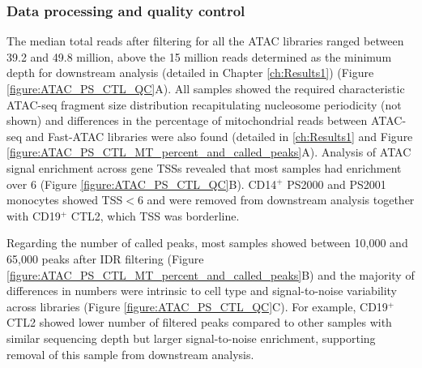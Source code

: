 \subsubsection{Data processing and quality control}
The median total reads after filtering for all the ATAC libraries ranged between 39.2 and 49.8 million, above the 15 million reads determined as the minimum depth for downstream analysis (detailed in Chapter \ref{ch:Results1}) (Figure \ref{figure:ATAC_PS_CTL_QC}A). All samples showed the required characteristic ATAC-seq fragment size distribution recapitulating nucleosome periodicity (not shown) and differences in the percentage of mitochondrial reads between ATAC-seq and Fast-ATAC libraries were also found (detailed in \ref{ch:Results1} and Figure \ref{figure:ATAC_PS_CTL_MT_percent_and_called_peaks}A). Analysis of ATAC signal enrichment across gene TSSs revealed that most samples had enrichment over 6 (Figure \ref{figure:ATAC_PS_CTL_QC}B). CD14$^+$ PS2000 and PS2001 monocytes showed TSS$<$6 and were removed from downstream analysis together with CD19$^+$ CTL2, which TSS was borderline.  %

Regarding the number of called peaks, most samples showed between 10,000 and 65,000 peaks after IDR filtering (Figure \ref{figure:ATAC_PS_CTL_MT_percent_and_called_peaks}B) and the majority of differences in numbers were intrinsic to cell type and signal-to-noise variability across libraries (Figure \ref{figure:ATAC_PS_CTL_QC}C). For example, CD19$^+$ CTL2 showed lower number of filtered peaks compared to other samples with similar sequencing depth but larger signal-to-noise enrichment, supporting removal of this sample from downstream analysis.


